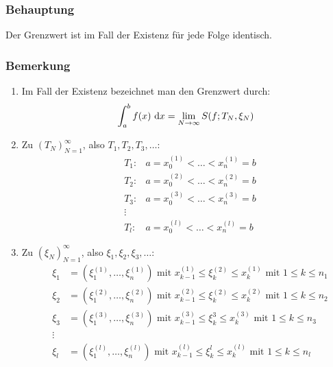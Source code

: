 \subsubsection{Behauptung}
Der Grenzwert ist im Fall der Existenz für jede Folge identisch.

\subsubsection{Bemerkung}
\begin{enumerate}[label= (\alph*)]
    \item Im Fall der Existenz bezeichnet man den Grenzwert durch:
        \begin{equation*}
            \int_{a}^b f(x) \text{ d}x = \lim_{N \rightarrow \infty} S(f; T_N, \xi_N)
        \end{equation*}
    \item Zu ${(T_N)}_{N=1}^\infty$, also $T_1, T_2, T_3, \ldots$:
        \begin{eqnarray*}
            &T_1:& a = x_0^{(1)} < \ldots < x_n^{(1)} = b\\
            &T_2:& a = x_0^{(2)} < \ldots < x_n^{(2)} = b\\
            &T_3:& a = x_0^{(3)} < \ldots < x_n^{(3)} = b\\
            &\vdots&\\
            &T_l:& a = x_0^{(l)} < \ldots < x_n^{(l)} = b
        \end{eqnarray*}
    \item Zu ${(\xi_N)}_{N=1}^\infty$, also $\xi_1, \xi_2, \xi_3, \ldots$:
        \begin{eqnarray*}
            &\xi_1& = (\xi_1^{(1)}, \ldots, \xi_n^{(1)})
            \text{ mit } x_{k-1}^{(1)} \leq \xi_k^{(2)} \leq x_k^{(1)}
            \text{ mit } 1 \leq k \leq n_1\\
            &\xi_2& = (\xi_1^{(2)}, \ldots, \xi_n^{(2)})
            \text{ mit } x_{k-1}^{(2)} \leq \xi_k^{(2)} \leq x_k^{(2)}
            \text{ mit } 1 \leq k \leq n_2\\
            &\xi_3& = (\xi_1^{(3)}, \ldots, \xi_n^{(3)})
            \text{ mit } x_{k-1}^{(3)} \leq \xi_k^{3} \leq x_k^{(3)}
            \text{ mit } 1 \leq k \leq n_3\\
            &\vdots&\\
            &\xi_l& = (\xi_1^{(l)}, \ldots, \xi_n^{(l)})
            \text{ mit } x_{k-1}^{(l)} \leq \xi_k^{l} \leq x_k^{(l)}
            \text{ mit } 1 \leq k \leq n_l\\

\end{eqnarray*}
\end{enumerate}
